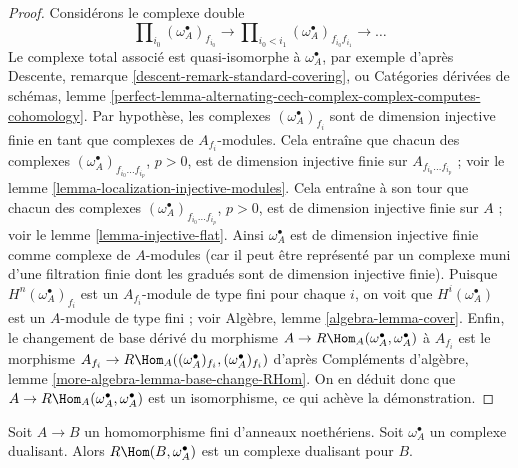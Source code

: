 \begin{proof}
Considérons le complexe double
$$
\prod\nolimits_{i_0} (\omega_A^\bullet)_{f_{i_0}}
\to
\prod\nolimits_{i_0 < i_1} (\omega_A^\bullet)_{f_{i_0}f_{i_1}}
\to \ldots
$$
Le complexe total associé est quasi-isomorphe à $\omega_A^\bullet$,
par exemple d'après Descente, remarque \ref{descent-remark-standard-covering},
ou Catégories dérivées de schémas, lemme \ref{perfect-lemma-alternating-cech-complex-complex-computes-cohomology}.
Par hypothèse, les complexes $(\omega_A^\bullet)_{f_i}$ sont de dimension injective finie
en tant que complexes de $A_{f_i}$-modules.
Cela entraîne que chacun des complexes $(\omega_A^\bullet)_{f_{i_0} \ldots f_{i_p}}$, $p > 0$,
est de dimension injective finie sur $A_{f_{i_0} \ldots f_{i_p}}$ ; voir le lemme \ref{lemma-localization-injective-modules}.
Cela entraîne à son tour que chacun des complexes $(\omega_A^\bullet)_{f_{i_0} \ldots f_{i_p}}$, $p > 0$,
est de dimension injective finie sur $A$ ; voir le lemme \ref{lemma-injective-flat}.
Ainsi $\omega_A^\bullet$ est de dimension injective finie comme complexe de $A$-modules
(car il peut être représenté par un complexe muni d'une filtration finie
dont les gradués sont de dimension injective finie).
Puisque $H^n(\omega_A^\bullet)_{f_i}$ est un $A_{f_i}$-module de type fini pour chaque $i$,
on voit que $H^i(\omega_A^\bullet)$ est un $A$-module de type fini ; voir Algèbre, lemme \ref{algebra-lemma-cover}.
Enfin, le changement de base dérivé du morphisme $A \to R\Hom_A(\omega_A^\bullet, \omega_A^\bullet)$ à $A_{f_i}$
est le morphisme $A_{f_i} \to R\Hom_A((\omega_A^\bullet)_{f_i}, (\omega_A^\bullet)_{f_i})$ d'après Compléments d'algèbre, lemme \ref{more-algebra-lemma-base-change-RHom}.
On en déduit donc que
$A \to R\Hom_A(\omega_A^\bullet, \omega_A^\bullet)$
est un isomorphisme, ce qui achève la démonstration.
\end{proof}

\begin{lemma}
\label{lemma-dualizing-finite}
Soit $A \to B$ un homomorphisme fini d'anneaux noethériens.
Soit $\omega_A^\bullet$ un complexe dualisant.
Alors $R\Hom(B, \omega_A^\bullet)$ est un complexe dualisant pour $B$.
\end{lemma}

